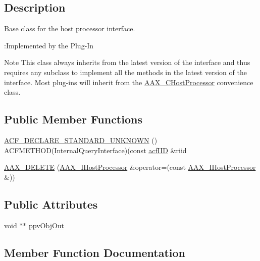 \subsection{Description}
Base class for the host processor interface. 

\begin{DoxyRefDesc}{\+:\+Implemented by the Plug-\/\+In}
\item[\hyperlink{a00004__aax_plugin_implementation000004}{\+:\+Implemented by the Plug-\/\+In}]\end{DoxyRefDesc}


\begin{DoxyNote}{Note}
This class always inherits from the latest version of the interface and thus requires any subclass to implement all the methods in the latest version of the interface. Most plug-\/ins will inherit from the \hyperlink{a00020}{A\+A\+X\+\_\+\+C\+Host\+Processor} convenience class. 
\end{DoxyNote}
\subsection*{Public Member Functions}
\begin{DoxyCompactItemize}
\item 
\hyperlink{a00101_aad3a3b1dcb09094588b31c2508c64484}{A\+C\+F\+\_\+\+D\+E\+C\+L\+A\+R\+E\+\_\+\+S\+T\+A\+N\+D\+A\+R\+D\+\_\+\+U\+N\+K\+N\+O\+W\+N} () A\+C\+F\+M\+E\+T\+H\+O\+D(Internal\+Query\+Interface)(const \hyperlink{a00150_a59df0b41744eee7a066787aaedf97f67}{acf\+I\+I\+D} \&riid
\item 
\hyperlink{a00101_a49bf62b79b57465c39238b54fc836753}{A\+A\+X\+\_\+\+D\+E\+L\+E\+T\+E} (\hyperlink{a00101}{A\+A\+X\+\_\+\+I\+Host\+Processor} \&operator=(const \hyperlink{a00101}{A\+A\+X\+\_\+\+I\+Host\+Processor} \&))
\end{DoxyCompactItemize}
\subsection*{Public Attributes}
\begin{DoxyCompactItemize}
\item 
void $\ast$$\ast$ \hyperlink{a00101_a780e10c6159c1af2e1a62f990131ca78}{ppv\+Obj\+Out}
\end{DoxyCompactItemize}


\subsection{Member Function Documentation}
\hypertarget{a00101_aad3a3b1dcb09094588b31c2508c64484}{}
